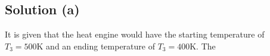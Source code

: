\documentclass[12pt]{article}
\begin{document}
        \subsection{Solution (a)}
            It is given that the heat engine would have the starting temperature of $T_3 = 500\unit{\kelvin}$ and an ending temperature of $T_3 = 400\unit{\kelvin}$. 
            The 
\end{document}
